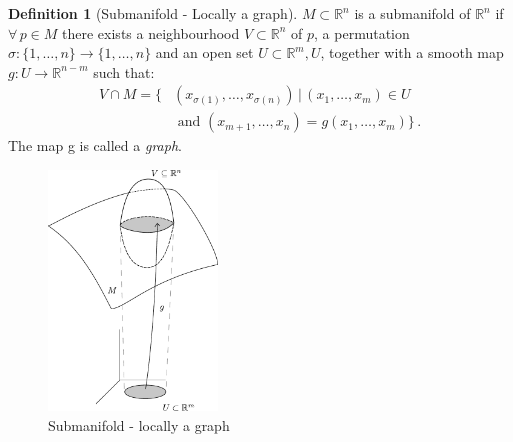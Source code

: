 \documentclass[a4paper,11pt,titlepage, article, oneside]{memoir}
\numberwithin{equation}{section}
\theoremstyle{definition}
\newtheorem{definition}[theorem]{Definition}
\theoremstyle{remark}
\newcommand{\rfield}{\mathbb{R}}
\begin{document}
\begin{definition}[Submanifold - Locally a graph] \label{sub4}
  $M \subset \rfield^n$ is a submanifold of $\rfield^n$ if $\forall \, p \in M$ there exists a neighbourhood $V \subset \rfield^n$ of $p$, a permutation $\sigma \colon \{1, \ldots, n\} \rightarrow \{1, \ldots, n\}$ and an open set $U \subset \rfield^m, U$, together with a smooth map $g \colon U \rightarrow \rfield^{n-m}$ such that:
  \begin{align*}
  V \cap M = \{ &(x_{\sigma(1)}, \ldots, x_{\sigma(n)}) \, |\, (x_1, \ldots, x_m) \in U \\
   &\text{ and } (x_{m+1}, \ldots, x_n) = g(x_1, \ldots, x_m)\} \, .
\end{align*}
  The map g is called a \textit{graph}.
  \begin{figure}[H]
  \label{Fig:submanifold4}
     \centering
     \includegraphics[width=0.4\textwidth]{Images/submanifold4.pdf}
     \caption{Submanifold - locally a graph}
\end{figure}
\end{definition}
\end{document}
